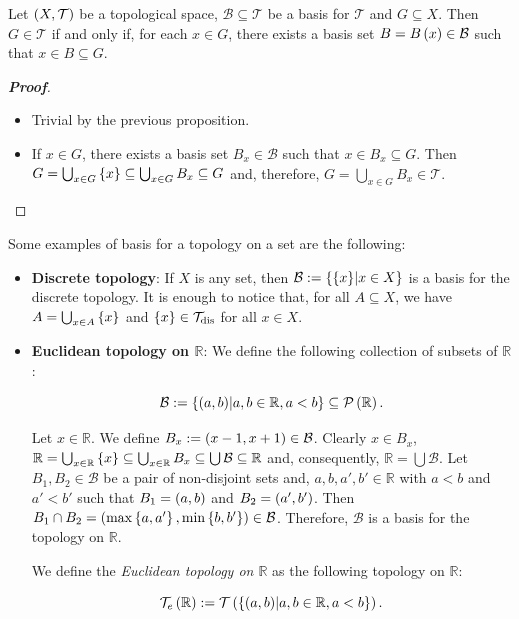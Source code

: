 \begin{proposition}
  Let $\left(X,\mathcal{T}\right)$ be a topological space, $\mathcal{B}\subseteq\mathcal{T}$ be a basis for $\mathcal{T}$ and $G\subseteq X$. Then $G\in\mathcal{T}$ if and only if, for each $x\in G$, there exists a basis set $B=B\left(x\right)\in\mathcal{B}$ such that $x\in B\subseteq G$.
  \begin{proof}[\rm\textbf{Proof}]
    \hfill
    \begin{itemize}
      \item[\boxed{\Rightarrow}] Trivial by the previous proposition.
      \item[\boxed{\Leftarrow}] If $x\in G$, there exists a basis set $B_x\in\mathcal{B}$ such that $x\in B_x\subseteq G$. Then $G=\bigcup_{x\in G}{\left\{x\right\}}\subseteq\bigcup_{x\in G}{B_x}\subseteq G$ and, therefore, $G=\bigcup_{x\in G}{B_x}\in\mathcal{T}$.
    \end{itemize}
  \end{proof}
\end{proposition}

\begin{example}
  Some examples of basis for a topology on a set are the following:

  \begin{itemize}
    \item \textbf{Discrete topology}: If $X$ is any set, then $\mathcal{B}:=\left\{\left\{x\right\}\middle|x\in X\right\}$ is a basis for the discrete topology. It is enough to notice that, for all $A\subseteq X$, we have $A=\bigcup_{x\in A}{\left\{x\right\}}$ and $\left\{x\right\}\in\mathcal{T}_{\text{dis}}$ for all $x\in X$.
    \item \textbf{Euclidean topology on $\mathbb{R}$}: We define the following collection of subsets of $\mathbb{R}$:

    \begin{equation}
        \mathcal{B}:=\left\{\left(a,b\right)\middle|a,b\in\mathbb{R},a<b\right\}\subseteq\mathcal{P}\left(\mathbb{R}\right).
    \end{equation}

    Let $x\in\mathbb{R}$. We define $B_x:=\left(x-1,x+1\right)\in\mathcal{B}$. Clearly $x\in B_x$, $\mathbb{R}=\bigcup_{x\in\mathbb{R}}{\left\{x\right\}}\subseteq\bigcup_{x\in\mathbb{R}}{B_x}\subseteq\bigcup{\mathcal{B}}\subseteq\mathbb{R}$ and, consequently, $\mathbb{R}=\bigcup{\mathcal{B}}$. Let $B_1,B_2\in\mathcal{B}$ be a pair of non-disjoint sets and, $a,b,a',b'\in\mathbb{R}$ with $a<b$ and $a'<b'$ such that $B_1=\left(a,b\right)$ and $B_2=\left(a',b'\right)$. Then $B_1\cap B_2=\left(\max\left\{a,a'\right\},\min\left\{b,b'\right\}\right)\in\mathcal{B}$. Therefore, $\mathcal{B}$ is a basis for the topology on $\mathbb{R}$.
    
    We define the \emph{Euclidean topology on $\mathbb{R}$} as the following topology on $\mathbb{R}$:
    
    \begin{equation}
      \mathcal{T}_{e}\left(\mathbb{R}\right):=\mathcal{T}\left(\left\{\left(a,b\right)\middle|a,b\in\mathbb{R},a<b\right\}\right).
    \end{equation}
  \end{itemize}
\end{example}


